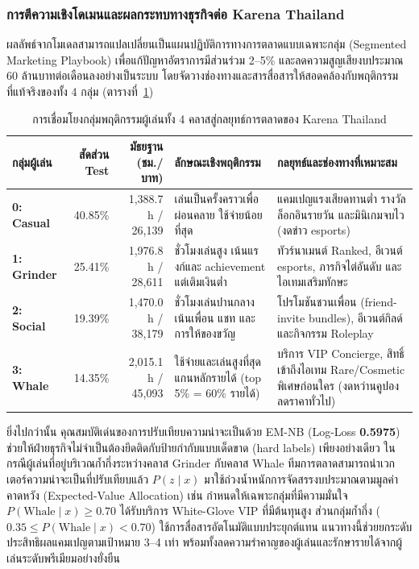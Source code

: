 \subsubsection{การตีความเชิงโดเมนและผลกระทบทางธุรกิจต่อ Karena Thailand}
\label{subsubsec:t2_domain_impact}

ผลลัพธ์จากโมเดลสามารถแปลเปลี่ยนเป็นแผนปฏิบัติการทางการตลาดแบบเฉพาะกลุ่ม (Segmented Marketing Playbook) เพื่อแก้ปัญหาอัตราการมีส่วนร่วม 2--5\% และลดความสูญเสียงบประมาณ 60 ล้านบาทต่อเดือนลงอย่างเป็นระบบ โดยจัดวางช่องทางและสารสื่อสารให้สอดคล้องกับพฤติกรรมที่แท้จริงของทั้ง 4 กลุ่ม (ตารางที่~\ref{tab:t2_business_playbook})

\begin{table}[htbp]
  \centering
  \caption{การเชื่อมโยงกลุ่มพฤติกรรมผู้เล่นทั้ง 4 คลาสสู่กลยุทธ์การตลาดของ Karena Thailand}
  \label{tab:t2_business_playbook}
  {\footnotesize
  \begin{tabularx}{\textwidth}{@{}p{2.1cm} r r X X@{}}
    \toprule
    \textbf{กลุ่มผู้เล่น} & \textbf{สัดส่วน Test} & \textbf{มัธยฐาน (ชม./บาท)} & \textbf{ลักษณะเชิงพฤติกรรม} & \textbf{กลยุทธ์และช่องทางที่เหมาะสม} \\
    \midrule
    \textbf{0: Casual} & 40.85\% & 1,388.7 h / 26,139 & เล่นเป็นครั้งคราวเพื่อผ่อนคลาย ใช้จ่ายน้อยที่สุด & แคมเปญแรงเสียดทานต่ำ รางวัลล็อกอินรายวัน และมินิเกมจบไว (งดข่าว esports) \\
    \textbf{1: Grinder} & 25.41\% & 1,976.8 h / 28,611 & ชั่วโมงเล่นสูง เน้นแรงก์และ achievement แต่เติมเงินต่ำ & ทัวร์นาเมนต์ Ranked, อีเวนต์ esports, ภารกิจไต่อันดับ และไอเทมเสริมทักษะ \\
    \textbf{2: Social} & 19.39\% & 1,470.0 h / 38,179 & ชั่วโมงเล่นปานกลาง เน้นเพื่อน แชท และการให้ของขวัญ & โปรโมชันชวนเพื่อน (friend-invite bundles), อีเวนต์กิลด์ และกิจกรรม Roleplay \\
    \textbf{3: Whale} & 14.35\% & 2,015.1 h / 45,093 & ใช้จ่ายและเล่นสูงที่สุด แกนหลักรายได้ (top 5\% = 60\% รายได้) & บริการ VIP Concierge, สิทธิ์เข้าถึงไอเทม Rare/Cosmetic พิเศษก่อนใคร (งดหว่านคูปองลดราคาทั่วไป) \\
    \bottomrule
  \end{tabularx}}
\end{table}

ยิ่งไปกว่านั้น คุณสมบัติเด่นของการปรับเทียบความน่าจะเป็นด้วย EM-NB (Log-Loss \textbf{0.5975}) ช่วยให้ฝ่ายธุรกิจไม่จำเป็นต้องยึดติดกับป้ายกำกับแบบเด็ดขาด (hard labels) เพียงอย่างเดียว ในกรณีผู้เล่นที่อยู่บริเวณก้ำกึ่งระหว่างคลาส Grinder กับคลาส Whale ทีมการตลาดสามารถนำเวกเตอร์ความน่าจะเป็นที่ปรับเทียบแล้ว $P(z \mid x)$ มาใช้ถ่วงน้ำหนักการจัดสรรงบประมาณตามมูลค่าคาดหวัง (Expected-Value Allocation) เช่น กำหนดให้เฉพาะกลุ่มที่มีความมั่นใจ $P(\mathrm{Whale} \mid x) \ge 0.70$ ได้รับบริการ White-Glove VIP ที่มีต้นทุนสูง ส่วนกลุ่มก้ำกึ่ง ($0.35 \le P(\mathrm{Whale} \mid x) < 0.70$) ใช้การสื่อสารอัตโนมัติแบบประยุกต์แทน แนวทางนี้ช่วยยกระดับประสิทธิผลแคมเปญตามเป้าหมาย 3--4 เท่า พร้อมทั้งลดความรำคาญของผู้เล่นและรักษารายได้จากผู้เล่นระดับพรีเมียมอย่างยั่งยืน
